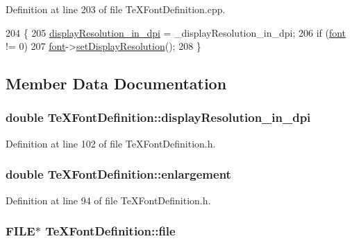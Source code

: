 Definition at line 203 of file Te\+X\+Font\+Definition.\+cpp.


\begin{DoxyCode}
204 \{
205   \hyperlink{classTeXFontDefinition_a08e27df7d9764c43308c5637906658c5}{displayResolution\_in\_dpi} = \_displayResolution\_in\_dpi;
206   \textcolor{keywordflow}{if} (\hyperlink{classTeXFontDefinition_a3e788e09d8978795672226b472163b4f}{font} != 0)
207     \hyperlink{classTeXFontDefinition_a3e788e09d8978795672226b472163b4f}{font}->\hyperlink{classTeXFont_aecb5ab55908369eb7b96f84b91771593}{setDisplayResolution}();
208 \}
\end{DoxyCode}


\subsection{Member Data Documentation}
\hypertarget{classTeXFontDefinition_a08e27df7d9764c43308c5637906658c5}{
\subsubsection[{display\+Resolution\+\_\+in\+\_\+dpi}]{\setlength{\rightskip}{0pt plus 5cm}double Te\+X\+Font\+Definition\+::display\+Resolution\+\_\+in\+\_\+dpi}}\label{classTeXFontDefinition_a08e27df7d9764c43308c5637906658c5}


Definition at line 102 of file Te\+X\+Font\+Definition.\+h.

\hypertarget{classTeXFontDefinition_ad49309e518eb93ef852667ccc2b324f3}{
\subsubsection[{enlargement}]{\setlength{\rightskip}{0pt plus 5cm}double Te\+X\+Font\+Definition\+::enlargement}}\label{classTeXFontDefinition_ad49309e518eb93ef852667ccc2b324f3}


Definition at line 94 of file Te\+X\+Font\+Definition.\+h.

\hypertarget{classTeXFontDefinition_a5899cf41fd48fee065d13848ce3b81a8}{
\subsubsection[{file}]{\setlength{\rightskip}{0pt plus 5cm}F\+I\+L\+E$\ast$ Te\+X\+Font\+Definition\+::file}}\label{classTeXFontDefinition_a5899cf41fd48fee065d13848ce3b81a8}


